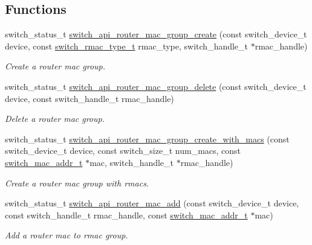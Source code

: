 \subsection*{Functions}
\begin{DoxyCompactItemize}
\item 
switch\+\_\+status\+\_\+t \hyperlink{group__RMAC_ga7c52f4e8160da45447b6671c17ca8f59}{switch\+\_\+api\+\_\+router\+\_\+mac\+\_\+group\+\_\+create} (const switch\+\_\+device\+\_\+t device, const \hyperlink{group__RMAC_gaa7deac8b108c4f020a3ef4ad546ade81}{switch\+\_\+rmac\+\_\+type\+\_\+t} rmac\+\_\+type, switch\+\_\+handle\+\_\+t $\ast$rmac\+\_\+handle)
\begin{DoxyCompactList}\small\item\em Create a router mac group. \end{DoxyCompactList}\item 
switch\+\_\+status\+\_\+t \hyperlink{group__RMAC_gaa00f77f280a6a2e6d03dc8e1df824178}{switch\+\_\+api\+\_\+router\+\_\+mac\+\_\+group\+\_\+delete} (const switch\+\_\+device\+\_\+t device, const switch\+\_\+handle\+\_\+t rmac\+\_\+handle)
\begin{DoxyCompactList}\small\item\em Delete a router mac group. \end{DoxyCompactList}\item 
switch\+\_\+status\+\_\+t \hyperlink{group__RMAC_ga547c463e0279c5e9d70a6634ff39414c}{switch\+\_\+api\+\_\+router\+\_\+mac\+\_\+group\+\_\+create\+\_\+with\+\_\+macs} (const switch\+\_\+device\+\_\+t device, const switch\+\_\+size\+\_\+t num\+\_\+macs, const \hyperlink{structswitch__mac__addr__s}{switch\+\_\+mac\+\_\+addr\+\_\+t} $\ast$mac, switch\+\_\+handle\+\_\+t $\ast$rmac\+\_\+handle)
\begin{DoxyCompactList}\small\item\em Create a router mac group with rmacs. \end{DoxyCompactList}\item 
switch\+\_\+status\+\_\+t \hyperlink{group__RMAC_gaab8b064c38ecec19f6cb7b492af70024}{switch\+\_\+api\+\_\+router\+\_\+mac\+\_\+add} (const switch\+\_\+device\+\_\+t device, const switch\+\_\+handle\+\_\+t rmac\+\_\+handle, const \hyperlink{structswitch__mac__addr__s}{switch\+\_\+mac\+\_\+addr\+\_\+t} $\ast$mac)
\begin{DoxyCompactList}\small\item\em Add a router mac to rmac group. \end{DoxyCompactList}\item 

\end{DoxyCompactItemize}
